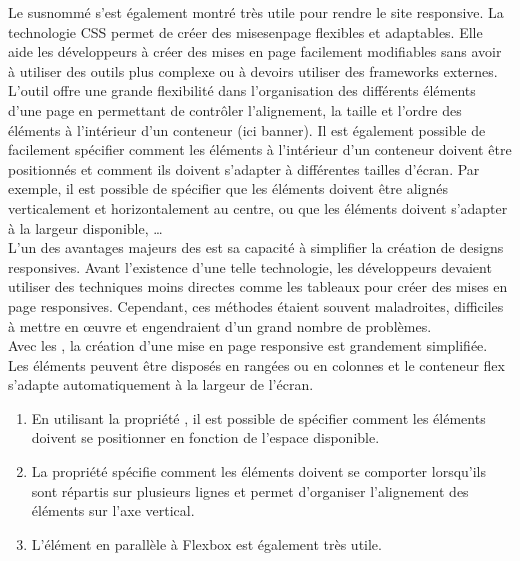 \documentclass[a4,10pt,french]{sphinxmanual}
\begin{document}
\sphinxAtStartPar
Le  susnommé s’est également montré très utile pour rendre le site responsive. La technologie CSS  permet de créer des mises\sphinxhyphen{}en\sphinxhyphen{}page flexibles et adaptables. Elle aide les développeurs à créer des mises en page facilement modifiables sans avoir à utiliser des outils plus complexe ou à devoirs utiliser des frameworks externes.\\
L’outil  offre une grande flexibilité dans l’organisation des différents éléments d’une page en permettant de contrôler l’alignement, la taille et l’ordre des éléments à l’intérieur d’un conteneur (ici banner). Il est également possible de facilement spécifier comment les éléments à l’intérieur d’un conteneur doivent être positionnés et comment ils doivent s’adapter à différentes tailles d’écran. Par exemple, il est possible de spécifier que les éléments doivent être alignés verticalement et horizontalement au centre, ou que les éléments doivent s’adapter à la largeur disponible, …\\
L’un des avantages majeurs des  est sa capacité à simplifier la création de designs responsives. Avant l’existence d’une telle technologie, les développeurs devaient utiliser des techniques moins directes comme les tableaux pour créer des mises en page responsives. Cependant, ces méthodes étaient souvent maladroites, difficiles à mettre en œuvre et engendraient d’un grand nombre de problèmes.\\
Avec les , la création d’une mise en page responsive est grandement simplifiée. Les éléments peuvent être disposés en rangées ou en colonnes et le conteneur flex s’adapte automatiquement à la largeur de l’écran.
\begin{enumerate}
%
\item {} 
\sphinxAtStartPar
En utilisant la propriété , il est possible de spécifier comment les éléments doivent se positionner en fonction de l’espace disponible.

\item {} 
\sphinxAtStartPar
La propriété  spécifie comment les éléments doivent se comporter lorsqu’ils sont répartis sur plusieurs lignes et permet d’organiser l’alignement des éléments sur l’axe vertical.

\item {} 
\sphinxAtStartPar
L’élément  en parallèle à Flex\sphinxhyphen{}box est également très utile.

\end{enumerate}
\end{document}
